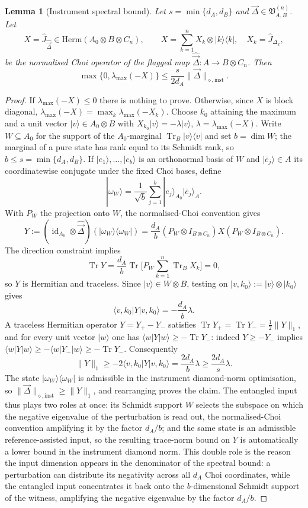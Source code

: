 \documentclass[11pt,a4paper]{article}
\newtheorem{lemma}[theorem]{Lemma}
\newcommand{\Herm}{\mathrm{Herm}}
\newcommand{\Tr}{\operatorname{Tr}}
\newcommand{\id}{\operatorname{id}}
\newcommand{\Jhat}{\widehat J}
\newcommand{\vD}{\vec{\Delta}}
\begin{document}
\begin{lemma}[Instrument spectral bound]
\label{lem:spectral}
Let $s=\min\{d_A,d_B\}$ and $\vD\in\mathfrak V_{A,B}^{(n)}$. Let
\[
X=\Jhat_{\widehat{\vD}}\in\Herm(A_0\otimes B\otimes C_n),\qquad
X=\sum_{k=1}^nX_k\otimes|k\rangle\langle k|,\quad X_k=\Jhat_{\Delta_k},
\]
be the normalised Choi operator of the flagged map $\widehat{\vD}:A\to B\otimes C_n$. Then
\[
\max\{0,\lambda_{\max}(-X)\}\le\frac{s}{2d_A}\|\vD\|_{\diamond,\mathrm{inst}}.
\]
\end{lemma}

\begin{proof}
If $\lambda_{\max}(-X)\le0$ there is nothing to prove. Otherwise, since $X$ is block diagonal, $\lambda_{\max}(-X)=\max_k\lambda_{\max}(-X_k)$. Choose $k_0$ attaining the maximum and a unit vector $|v\rangle\in A_0\otimes B$ with $X_{k_0}|v\rangle=-\lambda|v\rangle$, $\lambda=\lambda_{\max}(-X)$. Write $W\subseteq A_0$ for the support of the $A_0$-marginal $\Tr_B|v\rangle\langle v|$ and set $b=\dim W$; the marginal of a pure state has rank equal to its Schmidt rank, so $b\le s=\min\{d_A,d_B\}$. If $|e_1\rangle,\dots,|e_b\rangle$ is an orthonormal basis of $W$ and $|\overline e_j\rangle\in A$ its coordinatewise conjugate under the fixed Choi bases, define
\[
|\omega_W\rangle=\frac1{\sqrt b}\sum_{j=1}^b|e_j\rangle_{A_0}|\overline e_j\rangle_A.
\]
With $P_W$ the projection onto $W$, the normalised-Choi convention gives
\[
Y:=(\id_{A_0}\otimes\widehat{\vD})(|\omega_W\rangle\langle\omega_W|)
=\frac{d_A}{b}(P_W\otimes I_{B\otimes C_n})X(P_W\otimes I_{B\otimes C_n}).
\]
The direction constraint implies
\[
\Tr Y=\frac{d_A}{b}\Tr\Big[P_W\sum_{k=1}^n\Tr_BX_k\Big]=0,
\]
so $Y$ is Hermitian and traceless. Since $|v\rangle\in W\otimes B$, testing on $|v,k_0\rangle:=|v\rangle\otimes|k_0\rangle$ gives
\[
\langle v,k_0|Y|v,k_0\rangle=-\frac{d_A}{b}\lambda.
\]
A traceless Hermitian operator $Y=Y_+-Y_-$ satisfies $\Tr Y_+=\Tr Y_-=\tfrac12\|Y\|_1$, and for every unit vector $|w\rangle$ one has $\langle w|Y|w\rangle\ge-\Tr Y_-$: indeed $Y\ge-Y_-$ implies $\langle w|Y|w\rangle\ge-\langle w|Y_-|w\rangle\ge-\Tr Y_-$. Consequently
\[
\|Y\|_1\ge-2\langle v,k_0|Y|v,k_0\rangle
=\frac{2d_A}{b}\lambda\ge\frac{2d_A}{s}\lambda.
\]
The state $|\omega_W\rangle\langle\omega_W|$ is admissible in the instrument diamond-norm optimisation, so $\|\vD\|_{\diamond,\mathrm{inst}}\ge\|Y\|_1$, and rearranging proves the claim. The entangled input thus plays two roles at once: its Schmidt support $W$ selects the subspace on which the negative eigenvalue of the perturbation is read out, the normalised-Choi convention amplifying it by the factor $d_A/b$; and the same state is an admissible reference-assisted input, so the resulting trace-norm bound on $Y$ is automatically a lower bound in the instrument diamond norm. This double role is the reason the input dimension appears in the denominator of the spectral bound: a perturbation can distribute its negativity across all $d_A$ Choi coordinates, while the entangled input concentrates it back onto the $b$-dimensional Schmidt support of the witness, amplifying the negative eigenvalue by the factor $d_A/b$.
\end{proof}
\end{document}
